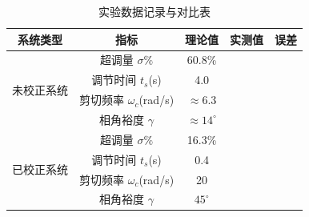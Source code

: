 \documentclass[12pt,a4paper,UTF8]{ctexart}
\begin{document}
\begin{table}[h]
\centering
{}
\renewcommand{\arraystretch}{1.5}
\caption{实验数据记录与对比表}
\begin{tabular}{|c|c|c|c|c|}
\hline
\textbf{系统类型} & \textbf{指标} & \textbf{理论值} & \textbf{实测值} & \textbf{误差} \\
\hline
\multirow{4}{*}{未校正系统} & 超调量 $\sigma\%$ & 60.8\% & & \\
\cline{2-5}
 & 调节时间 $t_s$(s) & 4.0 & & \\
\cline{2-5}
 & 剪切频率 $\omega_c$(rad/s) & $\approx6.3$ & & \\
\cline{2-5}
 & 相角裕度 $\gamma$ & $\approx14^\circ$ & & \\
\hline
\multirow{4}{*}{已校正系统} & 超调量 $\sigma\%$ & 16.3\% & & \\
\cline{2-5}
 & 调节时间 $t_s$(s) & 0.4 & & \\
\cline{2-5}
 & 剪切频率 $\omega_c$(rad/s) & 20 & & \\
\cline{2-5}
 & 相角裕度 $\gamma$ & $45^\circ$ & & \\
\hline
\end{tabular}
\end{table}
\end{document}
